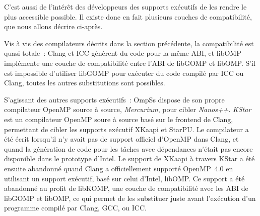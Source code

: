 C'est aussi de l'intérêt des développeurs des supports exécutifs de les rendre le plus accessible possible.
Il existe donc en fait plusieurs couches de compatibilité, que nous allons décrire ci-après.

Vis à vis des compilateurs décrits dans la section précédente, la compatibilité est quasi totale~: Clang et ICC génèrent du code pour la même ABI, et libOMP implémente une couche de compatibilité entre l'ABI de libGOMP et libOMP.
S'il est impossible d'utiliser libGOMP pour exécuter du code compilé par ICC ou Clang, toutes les autres substitutions sont possibles.

S'agissant des autres supports exécutifs~: OmpSs dispose de son propre compilateur OpenMP source à source, \emph{Mercurium}, pour cibler \emph{Nanos++}.
\emph{KStar} est un compilateur OpenMP soure à source basé sur le frontend de Clang, permettant de cibler les supports exécutif XKaapi et StarPU.
Le compilateur a été écrit lorsqu'il n'y avait pas de support officiel d'OpenMP dans Clang, et quand la génération de code pour les tâches avec dépendances n'était pas encore disponible dans le prototype d'Intel.
Le support de XKaapi à travers KStar a été ensuite abandonné quand Clang a officiellement supporté OpenMP~4.0 en utilisant un support exécutif, basé sur celui d'Intel, libOMP. Ce support a été abandonné au profit de libKOMP, une couche de compatibilité avec les ABI de libGOMP et libOMP, ce qui permet de les substituer juste avant l'exécution d'un programme compilé par Clang, GCC, ou ICC.

